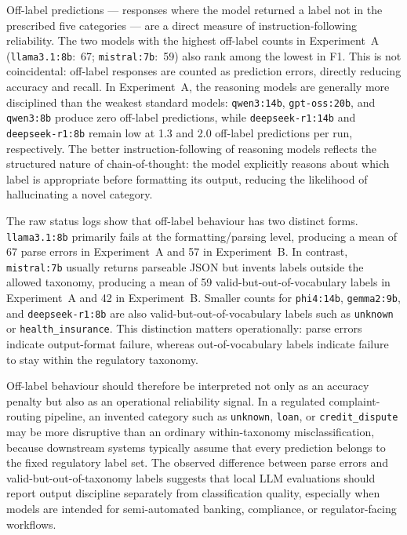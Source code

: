 \documentclass[journal]{IEEEtran}
\begin{document}
Off-label predictions — responses where the model returned a label
not in the prescribed five categories — are a direct measure of
instruction-following reliability. The two models with the highest off-label counts in Experiment~A
(\texttt{llama3.1:8b}:~67; \texttt{mistral:7b}:~59)
also rank among the lowest in F1. This is
not coincidental: off-label responses are counted as prediction
errors, directly reducing accuracy and recall. In Experiment~A, the
reasoning models are generally more disciplined than the weakest
standard models: \texttt{qwen3:14b}, \texttt{gpt-oss:20b}, and
\texttt{qwen3:8b} produce zero off-label predictions, while
\texttt{deepseek-r1:14b} and \texttt{deepseek-r1:8b} remain low at
1.3 and 2.0 off-label predictions per run, respectively.
The better instruction-following of reasoning models reflects the
structured nature of chain-of-thought: the model explicitly reasons
about which label is appropriate before formatting its output,
reducing the likelihood of hallucinating a novel category.

The raw status logs show that off-label behaviour has two distinct
forms. \texttt{llama3.1:8b} primarily fails at the formatting/parsing
level, producing a mean of 67 parse errors in Experiment~A and 57 in
Experiment~B. In contrast, \texttt{mistral:7b} usually returns
parseable JSON but invents labels outside the allowed taxonomy,
producing a mean of 59 valid-but-out-of-vocabulary labels in
Experiment~A and 42 in Experiment~B. Smaller counts for \texttt{phi4:14b},
\texttt{gemma2:9b}, and \texttt{deepseek-r1:8b} are also
valid-but-out-of-vocabulary labels such as \texttt{unknown} or
\texttt{health\_insurance}. This distinction matters operationally:
parse errors indicate output-format failure, whereas out-of-vocabulary
labels indicate failure to stay within the regulatory taxonomy.

Off-label behaviour should therefore be interpreted not only as an
accuracy penalty but also as an operational reliability signal. In a
regulated complaint-routing pipeline, an invented category such as
\texttt{unknown}, \texttt{loan}, or \texttt{credit\_dispute} may be
more disruptive than an ordinary within-taxonomy misclassification,
because downstream systems typically assume that every prediction
belongs to the fixed regulatory label set. The observed difference
between parse errors and valid-but-out-of-taxonomy labels suggests
that local LLM evaluations should report output discipline separately
from classification quality, especially when models are intended for
semi-automated banking, compliance, or regulator-facing workflows.
\end{document}

